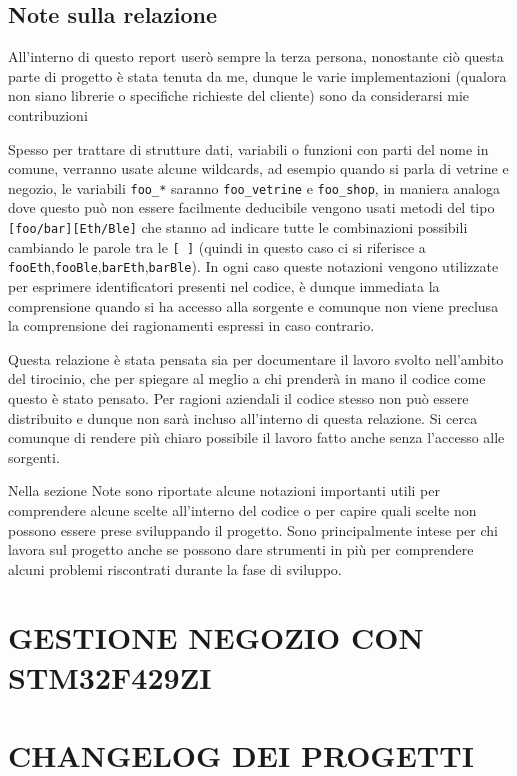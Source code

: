 \documentclass[a4paper,12pt]{article}
\begin{document}
\begin{em}

  \subsection{Note sulla relazione}

  All'interno di questo report user\`o sempre la terza persona, nonostante ci\`o questa parte di progetto \`e stata tenuta da me, dunque le varie implementazioni (qualora non siano librerie o specifiche richieste del cliente) sono da considerarsi mie contribuzioni

  Spesso per trattare di strutture dati, variabili o funzioni con parti del nome in comune, verranno usate alcune wildcards, ad esempio quando si parla di vetrine e negozio, le variabili \textup{\texttt{foo\_*}} saranno \textup{\texttt{foo\_vetrine}} e \textup{\texttt{foo\_shop}}, in maniera analoga dove questo pu\`o non essere facilmente deducibile vengono usati metodi del tipo \textup{\texttt{[foo/bar][Eth/Ble]}} che stanno ad indicare tutte le combinazioni possibili cambiando le parole tra le \textup{\texttt{[ ]}} (quindi in questo caso ci si riferisce a \textup{\texttt{fooEth}},\textup{\texttt{fooBle}},\textup{\texttt{barEth}},\textup{\texttt{barBle}}). In ogni caso queste notazioni vengono utilizzate per esprimere identificatori presenti nel codice, \`e dunque immediata la comprensione quando si ha accesso alla sorgente e comunque non viene preclusa la comprensione dei ragionamenti espressi in caso contrario.

  Questa relazione \`e stata pensata sia per documentare il lavoro svolto nell'ambito del tirocinio, che per spiegare al meglio a chi prender\`a in mano il codice come questo \`e stato pensato. Per ragioni aziendali il codice stesso non pu\`o essere distribuito e dunque non sar\`a incluso all'interno di questa relazione. Si cerca comunque di rendere pi\`u chiaro possibile il lavoro fatto anche senza l'accesso alle sorgenti.

  Nella sezione Note sono riportate alcune notazioni importanti utili per comprendere alcune scelte all'interno del codice o per capire quali scelte non possono essere prese sviluppando il progetto. Sono principalmente intese per chi lavora sul progetto anche se possono dare strumenti in pi\`u per comprendere alcuni problemi riscontrati durante la fase di sviluppo.

\end{em}

\section{GESTIONE NEGOZIO CON STM32F429ZI}



\newpage

\section{CHANGELOG DEI PROGETTI}


\end{document}
